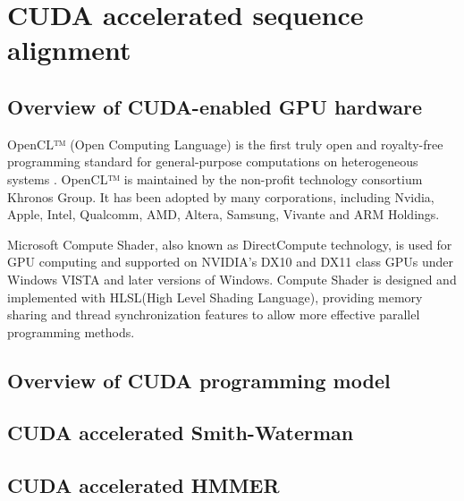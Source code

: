
\chapter{CUDA accelerated sequence alignment} %

\label{CUDASeqAlign} %



\section{Overview of CUDA-enabled GPU hardware}


OpenCL™ (Open Computing Language) is the first truly open and royalty-free programming standard for general-purpose computations on heterogeneous systems \citep{OpenCL}. OpenCL™ is maintained by the non-profit technology consortium Khronos Group. It has been adopted by many corporations, including Nvidia, Apple, Intel, Qualcomm, AMD, Altera, Samsung, Vivante and ARM Holdings.

Microsoft Compute Shader\citep{Shader}, also known as  DirectCompute technology, is used for GPU computing and supported on NVIDIA’s DX10 and DX11 class GPUs under Windows VISTA and later versions of Windows\citep{DirectCompute}. Compute Shader is designed and implemented with HLSL(High Level Shading Language)\citep{HLSL}, providing memory sharing and thread synchronization features to allow more effective parallel programming methods.


\section{Overview of CUDA programming model}




\section{CUDA accelerated Smith-Waterman}


\section{CUDA accelerated HMMER}

